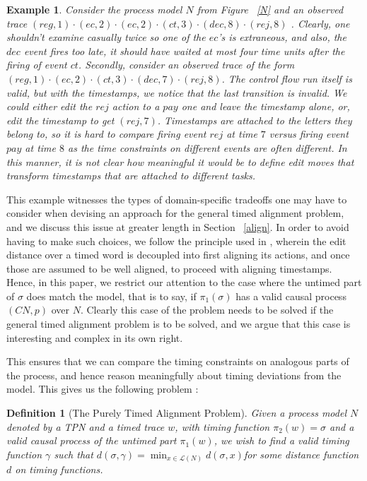 \documentclass[conference]{IEEEtran}
\newtheorem{definition}{Definition}
\newtheorem{example}{Example}
\begin{document}
	\begin{example}
		Consider the process model $N$ from Figure ~\ref{N} and an observed trace $(reg, 1) \cdot (ec, 2) \cdot (ec, 2) \cdot (ct, 3) \cdot (dec, 8) \cdot (rej, 8)$ . 
		Clearly, one shouldn't examine casually twice so one of the $ec$'s is extraneous, and also, the $dec$ event fires too late, it should have waited at most four time units after the firing of event $ct$. 
		Secondly, consider an observed trace of the form $(reg, 1) \cdot (ec, 2) \cdot (ct, 3) \cdot (dec, 7) \cdot (rej, 8)$. The control flow run itself is valid, but with the timestamps, we notice that the last transition is invalid. We could either edit the $rej$ action to a $pay$ one and leave the timestamp alone, or, edit the timestamp to get $(rej, 7)$. 
		Timestamps are attached to the letters they belong to, so it is hard to compare firing event $rej$ at time $7$ versus firing event $pay$ at time $8$ as the time constraints on different events are often different. In this manner, it is not clear how meaningful it would be to define edit moves that transform timestamps that are attached to different tasks. 
	\end{example}
	
	This example witnesses the types of domain-specific tradeoffs one may have to consider when devising an approach for the general timed alignment problem, and we discuss this issue at greater length in Section ~\ref{align}. 
	In order to avoid having to make such choices, we follow the principle used in \cite{CIM14}, wherein the edit distance over a timed word is decoupled into first aligning its actions, and once those are assumed to be well aligned, to proceed with aligning timestamps. 
	Hence, in this paper, we restrict our attention to the case where the untimed part of $\sigma$ does match the model, that is to say, if $\pi_1(\sigma)$ has a valid causal process $(CN, p)$ over $N$. 
	Clearly this case of the problem needs to be solved if the general timed alignment problem is to be solved, and we argue that this case is interesting and complex in its own right. 
	
	This ensures that we can compare the timing constraints on analogous parts of the process, and hence reason meaningfully about timing deviations from the model. This gives us the following problem : 
	
	\begin{definition}[The Purely Timed Alignment Problem]
		Given a process model $N$ denoted by a TPN and a timed trace $w$, with timing function $\pi_2(w) = \sigma$ and a valid causal process of the untimed part $\pi_1(w)$, we wish to find a valid timing function $\gamma$ such that $d(\sigma, \gamma) = \min_{x \in \mathcal{L}(N)} d(\sigma, x)$for some distance function $d$ on timing functions. 
		
	\end{definition}
	
\end{document}
